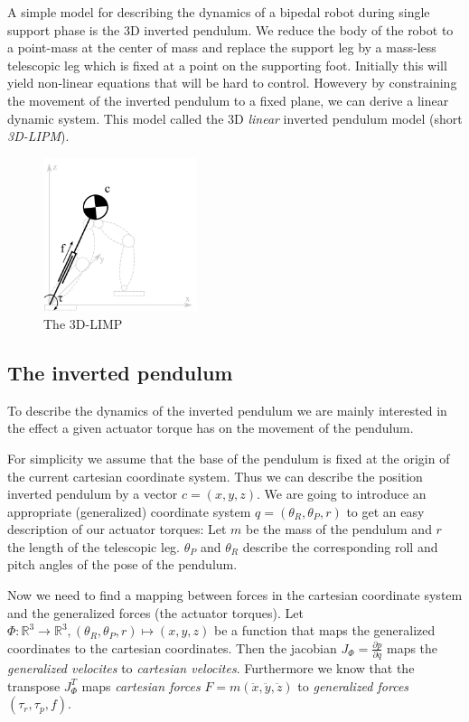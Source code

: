 \documentclass[english,ngerman]{KITreprt}
\begin{document}
A simple model for describing the dynamics of a bipedal robot during
single support phase is the 3D inverted pendulum. We reduce the body of
the robot to a point-mass at the center of mass and replace the support
leg by a mass-less telescopic leg which is fixed at a point on the
supporting foot. Initially this will yield non-linear equations that
will be hard to control. Howevery by constraining the movement of the
inverted pendulum to a fixed plane, we can derive a linear dynamic
system. This model called the 3D \emph{linear} inverted pendulum model
(short \emph{3D-LIPM}).

\begin{figure}
  \begin{center}
     \includegraphics[width=0.4\textwidth]{images/3dlimp.png}
  \end{center}
  \caption{The 3D-LIMP}
\end{figure}

\subsection{The inverted pendulum}\label{the-inverted-pendulum}

To describe the dynamics of the inverted pendulum we are mainly
interested in the effect a given actuator torque has on the movement of
the pendulum.

For simplicity we assume that the base of the pendulum is fixed at the
origin of the current cartesian coordinate system. Thus we can describe
the position inverted pendulum by a vector $c = (x, y, z)$. We are going
to introduce an appropriate (generalized) coordinate system
$q = (\theta_R, \theta_P, r)$ to get an easy description of our actuator
torques: Let $m$ be the mass of the pendulum and $r$ the length of the
telescopic leg. $\theta_P$ and $\theta_R$ describe the corresponding
roll and pitch angles of the pose of the pendulum.

Now we need to find a mapping between forces in the cartesian coordinate
system and the generalized forces (the actuator torques). Let
$\Phi: \mathbb{R}^3 \longrightarrow \mathbb{R}^3, (\theta_R, \theta_P, r) \mapsto (x, y, z)$
be a function that maps the generalized coordinates to the cartesian
coordinates. Then the jacobian $J_\Phi = \frac{\partial p}{\partial q}$
maps the \emph{generalized velocites} to \emph{cartesian velocites}.
Furthermore we know that the transpose $J_\Phi^T$ maps \emph{cartesian
forces} $F = m (\ddot x, \ddot y, \ddot z)$ to \emph{generalized forces}
$(\tau_r, \tau_p, f)$.
\end{document}
